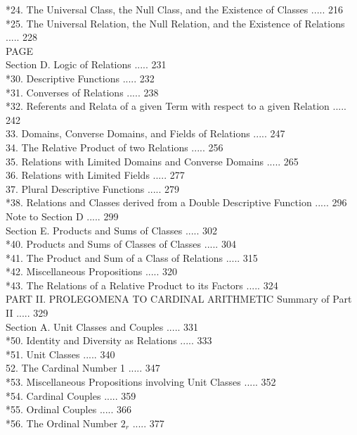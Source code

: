 \documentclass[10pt]{article}
\begin{document}
*24. The Universal Class, the Null Class, and the Existence of Classes ..... 216\\
*25. The Universal Relation, the Null Relation, and the Existence of Relations ..... 228\\
PAGE\\
Section D. Logic of Relations ..... 231\\
*30. Descriptive Functions ..... 232\\
*31. Converses of Relations ..... 238\\
*32. Referents and Relata of a given Term with respect to a given Relation ..... 242\\
33. Domains, Converse Domains, and Fields of Relations ..... 247\\
34. The Relative Product of two Relations ..... 256\\
35. Relations with Limited Domains and Converse Domains ..... 265\\
36. Relations with Limited Fields ..... 277\\
37. Plural Descriptive Functions ..... 279\\
*38. Relations and Classes derived from a Double Descriptive Function ..... 296\\
Note to Section D ..... 299\\
Section E. Products and Sums of Classes ..... 302\\
*40. Products and Sums of Classes of Classes ..... 304\\
*41. The Product and Sum of a Class of Relations ..... 315\\
*42. Miscellaneous Propositions ..... 320\\
*43. The Relations of a Relative Product to its Factors ..... 324\\
PART II. PROLEGOMENA TO CARDINAL ARITHMETIC Summary of Part II ..... 329\\
Section A. Unit Classes and Couples ..... 331\\
*50. Identity and Diversity as Relations ..... 333\\
*51. Unit Classes ..... 340\\
52. The Cardinal Number 1 ..... 347\\
*53. Miscellaneous Propositions involving Unit Classes ..... 352\\
*54. Cardinal Couples ..... 359\\
*55. Ordinal Couples ..... 366\\
*56. The Ordinal Number $2_{r}$ ..... 377\\
\end{document}
